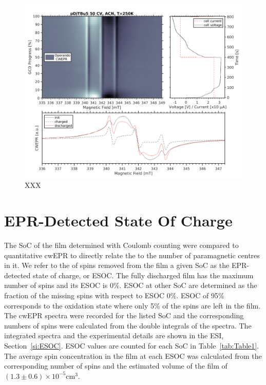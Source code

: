 \begin{figure}[h]
\center
	\includegraphics[width=1\textwidth]{./operando_epr/figures/slowcharge_231117_liquid_250K.pdf}
	\caption{XXX}
	\label{fig:operando_cold_cycle}
\end{figure}


\section{EPR-Detected State Of Charge}
\label{sec:ESOC}

The SoC of the film determined with Coulomb counting were compared to quantitative cwEPR to directly relate the \rs{,} to the number of paramagnetic centres in it. We refer to the  of spins removed from the  film  a given SoC as the EPR-detected state of charge, or ESOC. The fully discharged film has the maximum number of spins and its ESOC is 0\%. ESOC at other SoC are determined as the fraction of the missing spins with respect to ESOC 0\%. ESOC of 95\%  corresponds to the oxidation state where only 5\% of the  spins are left in the film. The cwEPR spectra were recorded for the listed SoC\rs{,} and the corresponding numbers of spins were calculated from the double integrals of the spectra. The integrated spectra and the experimental details are shown in the ESI, Section~\ref{si:ESOC}.  ESOC values are counted for each SoC in Table~\ref{tab:Table1}. The average spin concentration in the film  at each ESOC was calculated from the corresponding number of spins and the estimated volume of the film of $\left(1.3\pm0.6\right)\times10^{-5}$cm$^{3}$.


